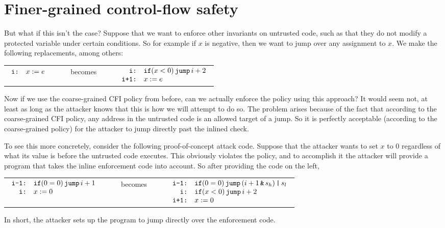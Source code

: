 \documentclass[11pt,twoside]{scrartcl}
\begin{document}
\section{Finer-grained control-flow safety}
But what if this isn't the case? Suppose that we want to enforce other invariants on untrusted code, such as that they do not modify a protected variable under certain conditions. So for example if $x$ is negative, then we want to jump over any assignment to $x$. We make the following replacements, among others:
\begin{center}
\begin{tabular}{lcl}
$
\begin{array}{ll}
\texttt{\upshape i:} & x := e
\end{array}
$
&
\ \ \ \ becomes\ \ \ \ 
&
$
\begin{array}{rl}
\texttt{\upshape i:} & \texttt{\upshape if}(x < 0)\,\texttt{\upshape jump}\,i+2 \\
\texttt{\upshape i+1:} & x := e
\end{array}
$
\end{tabular}
\end{center}
Now if we use the coarse-grained CFI policy from before, can we actually enforce the policy using this approach? It would seem not, at least as long as the attacker knows that this is how we will attempt to do so. The problem arises because of the fact that according to the coarse-grained CFI policy, any address in the untrusted code is an allowed target of a jump. So it is perfectly acceptable (according to the coarse-grained policy) for the attacker to jump directly past the inlined check.

To see this more concretely, consider the following proof-of-concept attack code. Suppose that the attacker wants to set $x$ to 0 regardless of what its value is before the untrusted code executes. This obviously violates the policy, and to accomplish it the attacker will provide a program that takes the inline enforcement code into account. So after providing the code on the left,
\begin{center}
\begin{tabular}{lcl}
$
\begin{array}{rl}
\texttt{\upshape i-1:} & \texttt{\upshape if}(0=0)\,\texttt{\upshape jump}\,i+1 \\
\texttt{\upshape i:} & x := 0
\end{array}
$
&
\ \ \ \ becomes\ \ \ \ 
&
$
\begin{array}{rl}
\texttt{\upshape i-1:} & \texttt{\upshape if}(0=0)\,\texttt{\upshape jump}\,(i+1 \operatorname{\texttt{\upshape \&}} s_h) \operatorname{\texttt{\upshape |}} s_l \\
\texttt{\upshape i:} & \texttt{\upshape if}(x < 0)\,\texttt{\upshape jump}\,i+2 \\
\texttt{\upshape i+1:} & x := 0
\end{array}
$
\end{tabular}
\end{center}
In short, the attacker sets up the program to jump directly over the enforcement code.
\end{document}
